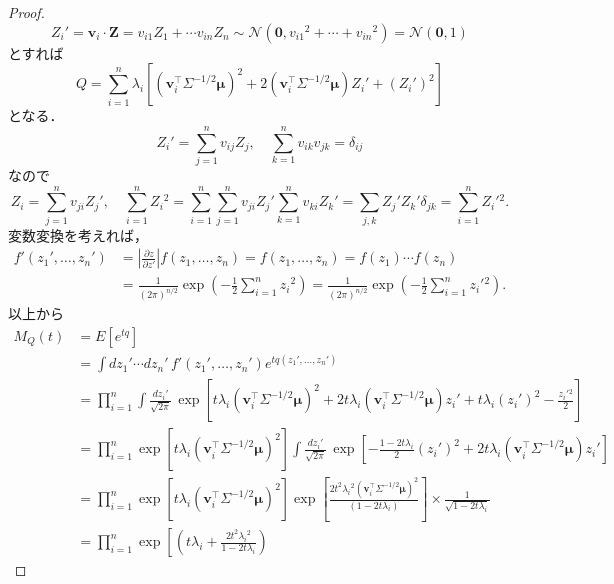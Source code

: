 \begin{proof}
  \[
  Z_i' =
  \boldsymbol{v}_i \cdot \boldsymbol{Z} = v_{i1} Z_1 + \cdots v_{in} Z_n
  \sim \mathcal{N}(\boldsymbol{0}, v_{i1}{}^2 + \cdots + v_{in}{}^2)
  = \mathcal{N}(\boldsymbol{0}, 1)
  \]
  とすれば
  \[
  Q = \sum_{i=1}^n \lambda_i
    \left[
      (\boldsymbol{v}_i^\top \Sigma^{-1/2} \boldsymbol{\mu})^2
      + 2(\boldsymbol{v}_i^\top \Sigma^{-1/2} \boldsymbol{\mu}) Z_i'
      + (Z_i')^2
    \right]
  \]
  となる．
  \[ Z_i' = \sum_{j=1}^n v_{ij} Z_j , \quad \sum_{k=1}^n v_{ik} v_{jk} = \delta_{ij} \]
  なので
  \[
  Z_i = \sum_{j=1}^n v_{ji} Z_j' , \quad
  \sum_{i=1}^n Z_i{}^2 = \sum_{i=1}^n \sum_{j=1}^n v_{ji} Z_j' \sum_{k=1}^n v_{ki} Z_k'
  = \sum_{j, k} Z_j' Z_k' \delta_{jk}
  = \sum_{i=1}^n Z_i'{}^2 .
  \]
  変数変換を考えれば，
  \begin{align*}
    f'(z_1', \ldots, z_n')
    &= \left\lvert \frac{\partial z}{\partial z'} \right\rvert f(z_1, \ldots, z_n)
    = f(z_1, \ldots, z_n)
    = f(z_1) \cdots f(z_n) \\
    &= \frac{1}{(2\pi)^{n/2}} \exp \left( - \frac{1}{2} \sum_{i=1}^n z_i{}^2  \right)
    = \frac{1}{(2\pi)^{n/2}} \exp \left( - \frac{1}{2} \sum_{i=1}^n z_i'{}^2  \right) .
  \end{align*}
  以上から
  \begin{align*}
    M_Q(t) &= E[e^{tq}] \\
    &= \int dz_1' \cdots dz_n' \, f'(z_1', \ldots, z_n') e^{tq(z_1', \ldots, z_n')} \\
    &= \prod_{i=1}^n \int \frac{dz_i'}{\sqrt{2\pi}} \,
    \exp \left[
      t \lambda_i (\boldsymbol{v}_i^\top \Sigma^{-1/2} \boldsymbol{\mu})^2
      + 2 t \lambda_i (\boldsymbol{v}_i^\top \Sigma^{-1/2} \boldsymbol{\mu}) z_i'
      + t \lambda_i (z_i')^2
      -  \frac{z_i'{}^2}{2}
    \right] \\
    &= \prod_{i=1}^n
    \exp \left[ t \lambda_i (\boldsymbol{v}_i^\top \Sigma^{-1/2} \boldsymbol{\mu})^2 \right]
    \int \frac{dz_i'}{\sqrt{2\pi}} \,
    \exp \left[
      - \frac{1 - 2t \lambda_i}{2} (z_i')^2
      + 2 t \lambda_i (\boldsymbol{v}_i^\top \Sigma^{-1/2} \boldsymbol{\mu}) z_i'
    \right] \\
    &= \prod_{i=1}^n
    \exp \left[ t \lambda_i (\boldsymbol{v}_i^\top \Sigma^{-1/2} \boldsymbol{\mu})^2 \right]
    \exp \left[ \frac{2 t^2 \lambda_i{}^2 (\boldsymbol{v}_i^\top \Sigma^{-1/2} \boldsymbol{\mu})^2}{(1 - 2t \lambda_i)} \right]
    \times \frac{1}{\sqrt{1 - 2t \lambda_i}} \\
    &= \prod_{i=1}^n
    \exp \left[
      \left(t \lambda_i  + \frac{2 t^2 \lambda_i{}^2 }{1 - 2t \lambda_i} \right)

\end{align*}
\end{proof}
